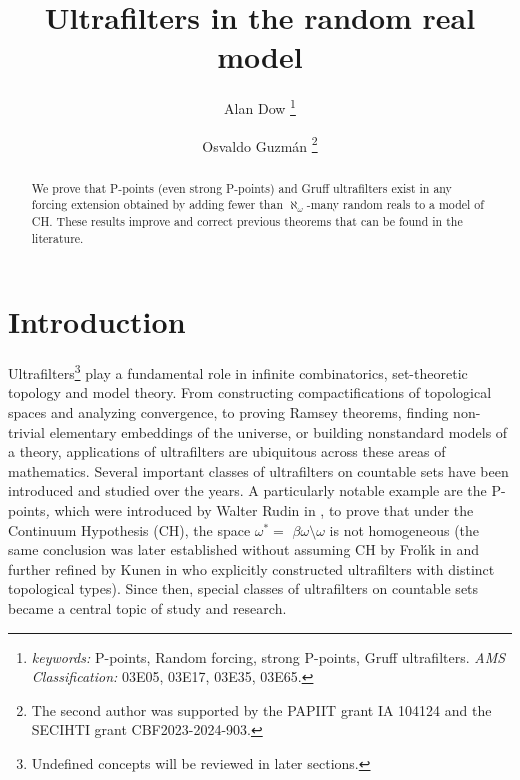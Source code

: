 \documentclass{article}%
\begin{document}
\date{}
\title{Ultrafilters in the random real model}
\author{Alan Dow \thanks{\textit{keywords: }\textsf{P}-points, Random forcing, strong
\textsf{P}-points, Gruff ultrafilters. \newline\textit{AMS Classification:}
03E05, 03E17, 03E35, 03E65.}
\and Osvaldo Guzm\'{a}n \thanks{The second author was supported by the PAPIIT grant
IA 104124 and the SECIHTI grant CBF2023-2024-903.}}
\maketitle

\begin{abstract}
We prove that \textsf{P}-points (even strong P-points) and Gruff ultrafilters
exist in any forcing extension obtained by adding fewer than $\aleph_{\omega}%
$-many random reals to a model of \textsf{CH. }These results improve and
correct previous theorems that can be found in the literature.

\end{abstract}

\section{Introduction}

Ultrafilters\footnote{Undefined concepts will be reviewed in later sections.}
play a fundamental role in infinite combinatorics, set-theoretic topology and
model theory. From constructing compactifications of topological spaces and
analyzing convergence, to proving Ramsey theorems, finding non-trivial
elementary embeddings of the universe, or building nonstandard models of a
theory, applications of ultrafilters are ubiquitous across these areas of
mathematics. Several important classes of ultrafilters on countable sets have
been introduced and studied over the years. A particularly notable example are
the \textsf{P}-points\emph{, }which were introduced by Walter Rudin in
\cite{Rudin}, to prove that under the Continuum Hypothesis (\textsf{CH}), the
space $\omega^{\ast}=$ $\beta\omega\setminus\omega$ is not homogeneous (the
same conclusion was later established without assuming \textsf{CH }by
Frol\'{\i}k in \cite{SumsofUltrafilters} and further refined by Kunen in
\cite{WeakPpointsin} who explicitly constructed ultrafilters with distinct
topological types). Since then, special classes of ultrafilters on countable
sets became a central topic of study and research.

\qquad\qquad\qquad
\end{document}
